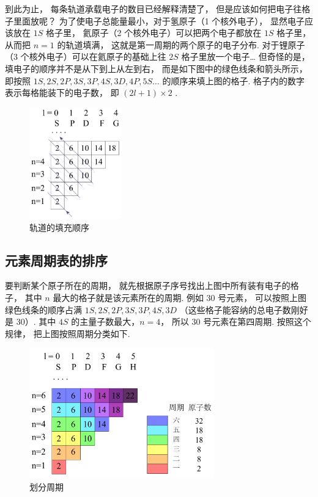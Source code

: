 到此为止， 每条轨道承载电子的数目已经解释清楚了， 但是应该如何把电子往格子里面放呢？ 为了使电子总能量最小，对于氢原子（1 个核外电子）， 显然电子应该放在 $1S$ 格子里， 氦原子（2 个核外电子）可以把两个电子都放在 $1S$ 格子里， 从而把 $n=1$ 的轨道填满， 这就是第一周期的两个原子的电子分布. 对于锂原子（3 个核外电子）可以在氦原子的基础上往 $2S$ 格子里放一个电子… 但奇怪的是， 填电子的顺序并不是从下到上从左到右， 而是如下图中的绿色线条和箭头所示， 即按照 $1S, 2S, 2P, 3S, 3P, 4S, 3D, 4P, 5S…$ 的顺序来填上图的格子. 格子内的数字表示每格能装下的电子数， 即 $(2l + 1) \times 2$ .
\begin{figure}[ht]
\centering
\includegraphics[width=4cm]{./figures/Ptable3.pdf}
\caption{轨道的填充顺序} 
\end{figure}

\subsection{元素周期表的排序}

要判断某个原子所在的周期， 就先根据原子序号找出上图中所有装有电子的格子， 其中 $n$ 最大的格子就是该元素所在的周期. 例如 30 号元素， 可以按照上图绿色线条的顺序占满 $1S, 2S, 2P, 3S, 3P, 4S, 3D$ （这些格子能容纳的总电子数刚好是 30）. 其中 $4S$ 的主量子数最大，$n=4$， 所以 30 号元素在第四周期. 按照这个规律， 把上图按照周期分类如下.
\begin{figure}[ht]
\centering
\includegraphics[width=8cm]{./figures/Ptable4.pdf}
\caption{划分周期} 
\end{figure}

